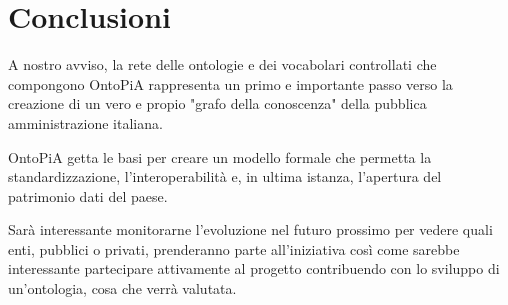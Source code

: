\chapter*{Conclusioni}

A nostro avviso, la rete delle ontologie e dei vocabolari controllati che compongono OntoPiA rappresenta un primo e importante passo verso la creazione di un vero e propio "grafo della conoscenza" della pubblica amministrazione italiana.

OntoPiA getta le basi per creare un modello formale che permetta la standardizzazione, l'interoperabilità e, in ultima istanza, l'apertura del patrimonio dati del paese.

Sarà interessante monitorarne l'evoluzione nel futuro prossimo per vedere quali enti, pubblici o privati, prenderanno parte all'iniziativa così come sarebbe interessante partecipare attivamente al progetto contribuendo con lo sviluppo di un'ontologia, cosa che verrà valutata.

